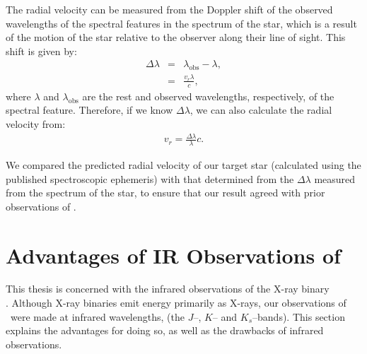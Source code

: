 \vspace{\myparskip}

The radial velocity can be measured from the
Doppler shift of the observed wavelengths of the spectral features
in the spectrum of the star, which is a result of the motion of the star relative to the observer along their line of sight. This shift is given by:%
\begin{eqnarray}\label{cha:InfraredDataReductionTechniques:sec:Spectroscopy:subsec:RadialVelocity:eqn:shift}
\Delta\lambda     & = & \lambda_{\mathrm{obs}} - \lambda,\\
               & = & \frac{v_r \lambda}{c},
\end{eqnarray}
where $\lambda$ and $\lambda_{\mathrm{obs}}$ are the rest and
observed wavelengths, respectively, of the spectral
feature. Therefore, if we know $\Delta\lambda$, we can also calculate the
radial velocity from:%
\begin{eqnarray}\label{cha:InfraredDataReductionTechniques:sec:Spectroscopy:subsec:RadialVelocity:eqn:vr2}
v_r = \frac{\Delta\lambda}{\lambda} c.
\end{eqnarray}

\vspace{\myparskip}

We compared the predicted radial velocity of our target star
(calculated using the published spectroscopic ephemeris) with that
determined from the $\Delta\lambda$ measured from the spectrum of the star, to ensure that our result agreed with prior observations of \groj. %


\section{Advantages of IR Observations of \groj}\label{cha:InfraredDataReductionTechniques:sec:InfraredAstronomy}

This thesis is concerned with the infrared observations of the X-ray binary\\%
\groj. Although X-ray binaries emit energy primarily as X-rays, our
observations of \groj\ were made at infrared wavelengths,
(the $J$--, $K$-- and $K_{s}$--bands). This section explains the
advantages for doing so, as well as the drawbacks of infrared
observations. %


